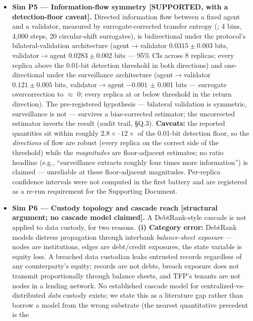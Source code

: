 \documentclass[
]{article}
\begin{document}
\begin{itemize}
\item
  \textbf{Sim P5 --- Information-flow symmetry {[}SUPPORTED, with a
  detection-floor caveat{]}.} Directed information flow between a fixed
  agent and a validator, measured by surrogate-corrected transfer
  entropy (; 4 bins, 4,000 steps, 20 circular-shift surrogates), is
  bidirectional under the protocol's bilateral-validation architecture
  (agent\(\to\)validator \(0.0315 \pm 0.003\) bits,
  validator\(\to\)agent \(0.0283 \pm 0.002\) bits --- 95\% CIs across 8
  replicas; every replica above the 0.01-bit detection threshold in both
  directions) and one-directional under the surveillance architecture
  (agent\(\to\)validator \(0.121 \pm 0.005\) bits, validator\(\to\)agent
  \(-0.001\) \(\pm\) 0.001 bits --- surrogate overcorrection to
  \(\approx\) 0; every replica at or below threshold in the return
  direction). The pre-registered hypothesis --- bilateral validation is
  symmetric, surveillance is not --- survives a bias-corrected
  estimator; the uncorrected estimator inverts the result (audit trail,
  §Q.3). \textbf{Caveats:} the reported quantities sit within roughly
  \(2.8\times\)--\(12\times\) of the 0.01-bit detection floor, so the
  \emph{directions} of flow are robust (every replica on the correct
  side of the threshold) while the \emph{magnitudes} are floor-adjacent
  estimates; no ratio headline (e.g., ``surveillance extracts roughly
  four times more information'') is claimed --- unreliable at these
  floor-adjacent magnitudes. Per-replica confidence intervals were not
  computed in the first battery and are registered as a re-run
  requirement for the Supporting Document.
\item
  \textbf{Sim P6 --- Custody topology and cascade reach {[}structural
  argument; no cascade model claimed{]}.} A DebtRank-style cascade is
  not applied to data custody, for two reasons. \textbf{(i) Category
  error:} DebtRank models distress propagation through interbank
  \emph{balance-sheet exposure} --- nodes are institutions, edges are
  debt/credit exposures, the state variable is equity loss. A breached
  data custodian leaks entrusted records regardless of any
  counterparty's equity; records are not debts, breach exposure does not
  transmit proportionally through balance sheets, and TFP's tenants are
  not nodes in a lending network. No established cascade model for
  centralized-vs-distributed \emph{data} custody exists; we state this
  as a literature gap rather than borrow a model from the wrong
  substrate (the nearest quantitative precedent is the

\end{itemize}
\end{document}

